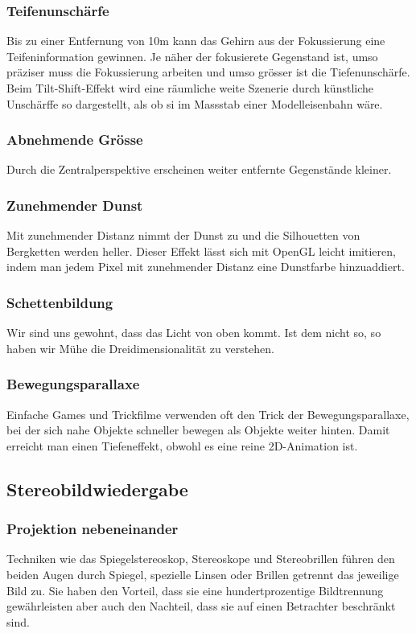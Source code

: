 \documentclass[10pt]{article}
\begin{document}
\subsubsection{Teifenunschärfe}
Bis zu einer Entfernung von 10m kann das Gehirn aus der Fokussierung eine Teifeninformation gewinnen. Je näher der fokusierete Gegenstand ist, umso präziser muss die Fokussierung arbeiten und umso grösser ist die Tiefenunschärfe. Beim Tilt-Shift-Effekt wird eine räumliche weite Szenerie durch künstliche Unschärffe so dargestellt, als ob si im Massstab einer Modelleisenbahn wäre.
\subsubsection{Abnehmende Grösse}
Durch die Zentralperspektive erscheinen weiter entfernte Gegenstände kleiner.
\subsubsection{Zunehmender Dunst}
Mit zunehmender Distanz nimmt der Dunst zu und die Silhouetten von Bergketten werden heller. Dieser Effekt lässt sich mit OpenGL leicht imitieren, indem man jedem Pixel mit zunehmender Distanz eine Dunstfarbe hinzuaddiert.
\subsubsection{Schettenbildung}
Wir sind uns gewohnt, dass das Licht von oben kommt. Ist dem nicht so, so haben wir Mühe die Dreidimensionalität  zu verstehen.
\subsubsection{Bewegungsparallaxe}
Einfache Games und Trickfilme verwenden oft den Trick der Bewegungsparallaxe, bei der sich nahe Objekte schneller bewegen als Objekte weiter hinten. Damit erreicht man einen Tiefeneffekt, obwohl es eine reine 2D-Animation ist.
\subsection{Stereobildwiedergabe}
\subsubsection{Projektion nebeneinander}
Techniken wie das Spiegelstereoskop, Stereoskope und Stereobrillen führen den beiden Augen durch Spiegel, spezielle Linsen oder Brillen getrennt das jeweilige Bild zu. Sie haben den Vorteil, dass sie eine hundertprozentige Bildtrennung gewährleisten aber auch den Nachteil, dass sie auf einen Betrachter beschränkt sind.
\end{document}
